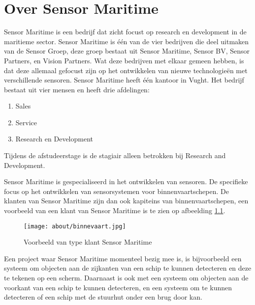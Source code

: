 \chapter{Over Sensor Maritime}
Sensor Maritime is een bedrijf dat zicht focust op research en development in de maritieme sector. Sensor Maritime is één van de vier bedrijven die deel uitmaken van de Sensor Groep, deze groep bestaat uit Sensor Maritime, Sensor BV, Sensor Partners, en Vision Partners. Wat deze bedrijven met elkaar gemeen hebben, is dat deze allemaal gefocust zijn op het ontwikkelen van nieuwe technologieën met verschillende sensoren. Sensor Maritime heeft één kantoor in Vught. Het bedrijf bestaat uit vier mensen en heeft drie afdelingen:
\begin{enumerate}
	\item Sales
	\item Service
	\item Research en Development
\end{enumerate}
Tijdens de afstudeerstage is de stagiair alleen betrokken bij Research and Development.
\newline

\noindent Sensor Maritime is gespecialiseerd in het ontwikkelen van sensoren. De specifieke focus op het ontwikkelen van sensorsystemen voor binnenvaartschepen. De klanten van Sensor Maritime zijn dan ook kapiteins van binnenvaartschepen, een voorbeeld van een klant van Sensor Maritime is te zien op afbeelding \ref{fig:customer_sensor_maritime}.
\begin{figure}[h!]

	\centering

	\label{fig:customer_sensor_maritime}
	\texttt{[image: about/binnevaart.jpg]}
	\caption{Voorbeeld van type klant Sensor Maritime}

\end{figure}

\noindent Een project waar Sensor Maritime momenteel bezig mee is, is bijvoorbeeld een systeem om objecten aan de zijkanten van een schip te kunnen detecteren en deze te tekenen op een scherm. Daarnaast is ook met een systeem om objecten aan de voorkant van een schip te kunnen detecteren, en een systeem om te kunnen detecteren of een schip met de stuurhut onder een brug door kan.
